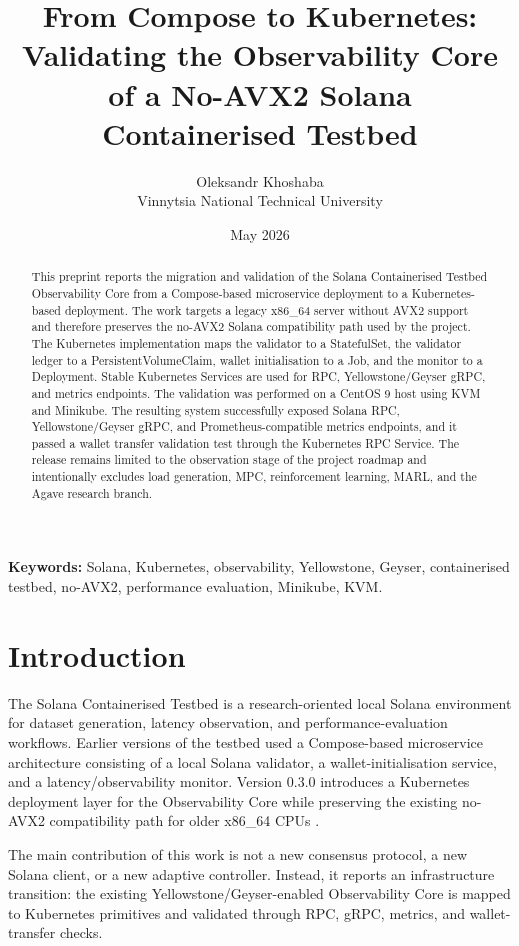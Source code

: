 \documentclass[11pt,a4paper]{article}
\title{From Compose to Kubernetes: Validating the Observability Core of a No-AVX2 Solana Containerised Testbed}
\author{
  Oleksandr Khoshaba\\
  Vinnytsia National Technical University
}
\date{May 2026}
\begin{document}
\maketitle

\begin{abstract}
This preprint reports the migration and validation of the Solana Containerised Testbed Observability Core from a Compose-based microservice deployment to a Kubernetes-based deployment. The work targets a legacy x86\_64 server without AVX2 support and therefore preserves the no-AVX2 Solana compatibility path used by the project. The Kubernetes implementation maps the validator to a StatefulSet, the validator ledger to a PersistentVolumeClaim, wallet initialisation to a Job, and the monitor to a Deployment. Stable Kubernetes Services are used for RPC, Yellowstone/Geyser gRPC, and metrics endpoints. The validation was performed on a CentOS 9 host using KVM and Minikube. The resulting system successfully exposed Solana RPC, Yellowstone/Geyser gRPC, and Prometheus-compatible metrics endpoints, and it passed a wallet transfer validation test through the Kubernetes RPC Service. The release remains limited to the observation stage of the project roadmap and intentionally excludes load generation, MPC, reinforcement learning, MARL, and the Agave research branch.
\end{abstract}

\textbf{Keywords:} Solana, Kubernetes, observability, Yellowstone, Geyser, containerised testbed, no-AVX2, performance evaluation, Minikube, KVM.

\section{Introduction}

The Solana Containerised Testbed is a research-oriented local Solana environment for dataset generation, latency observation, and performance-evaluation workflows. Earlier versions of the testbed used a Compose-based microservice architecture consisting of a local Solana validator, a wallet-initialisation service, and a latency/observability monitor. Version 0.3.0 introduces a Kubernetes deployment layer for the Observability Core while preserving the existing no-AVX2 compatibility path for older x86\_64 CPUs \citep{khoshaba_solana_testbed_v030}.

The main contribution of this work is not a new consensus protocol, a new Solana client, or a new adaptive controller. Instead, it reports an infrastructure transition: the existing Yellowstone/Geyser-enabled Observability Core is mapped to Kubernetes primitives and validated through RPC, gRPC, metrics, and wallet-transfer checks.
\end{document}
